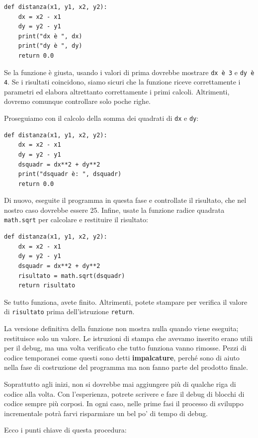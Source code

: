 \documentclass[10pt]{book}
\begin{document}
\begin{verbatim}
def distanza(x1, y1, x2, y2):
    dx = x2 - x1
    dy = y2 - y1
    print("dx è ", dx)
    print("dy è ", dy)
    return 0.0
\end{verbatim}
%
Se la funzione è giusta, usando i valori di prima dovrebbe mostrare \verb"dx è 3" e \verb"dy è 4". Se i risultati coincidono, siamo sicuri che la funzione riceve correttamente i parametri ed elabora altrettanto correttamente i primi calcoli. Altrimenti, dovremo comunque controllare solo poche righe.

Proseguiamo con il calcolo della somma dei quadrati di {\tt dx} e {\tt dy}:

\begin{verbatim}
def distanza(x1, y1, x2, y2):
    dx = x2 - x1
    dy = y2 - y1
    dsquadr = dx**2 + dy**2
    print("dsquadr è: ", dsquadr)
    return 0.0
\end{verbatim}
%
Di nuovo, eseguite il programma in questa fase e controllate il risultato, che nel nostro caso dovrebbe essere 25.
Infine, usate la funzione radice quadrata {\tt math.sqrt} per calcolare e restituire il risultato:

\begin{verbatim}
def distanza(x1, y1, x2, y2):
    dx = x2 - x1
    dy = y2 - y1
    dsquadr = dx**2 + dy**2
    risultato = math.sqrt(dsquadr)
    return risultato
\end{verbatim}
%
Se tutto funziona, avete finito. Altrimenti, potete stampare per verifica il valore di {\tt risultato} prima dell'istruzione {\tt return}.

La versione definitiva della funzione non mostra nulla quando viene eseguita; restituisce solo un valore. Le istruzioni di stampa che avevamo inserito erano utili per il debug, ma una volta verificato che tutto funziona vanno rimosse. Pezzi di codice temporanei come questi sono detti {\bf impalcature}, perché sono di aiuto nella fase di costruzione del programma ma non fanno parte del prodotto finale. 

Soprattutto agli inizi, non si dovrebbe mai aggiungere più di qualche riga
di codice alla volta. Con l'esperienza, potrete scrivere e fare il debug di blocchi di codice sempre più corposi. In ogni caso, nelle prime fasi il processo di sviluppo incrementale potrà farvi risparmiare un bel po' di tempo di debug.

Ecco i punti chiave di questa procedura:
\end{document}
